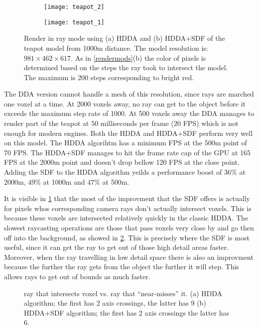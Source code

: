 \begin{figure}[H]
  \centering
  \begin{subfigure}[b]{0.48\textwidth}
    \texttt{[image: teapot\_2]}
    \caption{}
  \end{subfigure}
  \hfill
  \begin{subfigure}[b]{0.48\textwidth}
    \texttt{[image: teapot\_1]}
    \caption{}
  \end{subfigure}
  \caption{Render in ray mode using (a) HDDA and (b) HDDA+SDF of the teapot model from 1000m distance. The model resolution is: $981\times462\times617$. As in \cref{rendermods}(b) the color of pixels is determined based on the steps the ray took to intersect the model. The maximum is 200 steps corresponding to bright red.}
  \label{teacomp}
\end{figure}

The DDA version cannot handle a mesh of this resolution, since rays are marched one voxel at a time. At 2000 voxels away, no ray can get to the object before it exceeds the maximum step rate of 1000. At 500 voxels away the DDA manages to render part of the teapot at 50 milliseconds per frame ($20$ FPS) which is not enough for modern engines.
Both the HDDA and HDDA+SDF perform very well on this model. The HDDA algorihtm has a minimum FPS at the 500m point of 70 FPS. The HDDA+SDF manages to hit the frame rate cap of the GPU at 165 FPS at the 2000m point and doesn't drop bellow 120 FPS at the close point. Adding the SDF to the HDDA algorithm yeilds a performance boost of $36\%$ at 2000m, $49\%$ at 1000m and $47\%$ at 500m.

It is visible in \cref{teacomp} that the most of the improvment that the SDF offers is actually for pixels whos corresponding camera rays don't actually intersect voxels. This is because these voxels are intersected relatively quickly in the classic HDDA. The slowest raycasting operations are those that pass voxels very close by and go then off  into the background, as showed in \cref{steps}. This is precisely where the SDF is most useful, since it can get the ray to get out of those high detail areas faster. Moreover, when the ray travelling in low detail space there is also an improvment because the further the ray gets from the object the further it will step. This allows rays to get out of bounds as much faster.

\begin{figure}[H]
  \centering
  \begin{subfigure}{0.45\textwidth}
    \centering
    
    \caption{}
  \end{subfigure}
  \begin{subfigure}{0.45\textwidth}
    \centering
    
    \caption{}
  \end{subfigure}
  \caption{ray that intersects voxel vs. ray that ``near-misses'' it. (a) HDDA algorithm; the first has 2 axis crossings, the latter has 9 (b) HDDA+SDF algorithm; the first has 2 axis crossings the latter has 6.}
  \label{steps}
\end{figure}

